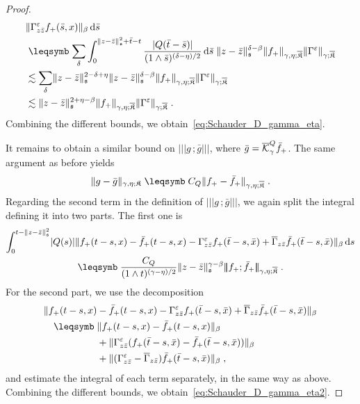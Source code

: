 \documentclass[reqno,11pt]{article}
\def\normDgamma#1{|\!|\!|#1|\!|\!|}
\def\seminormff#1#2{|\!|\!|#1\,\mathord{;}\,#2|\!|\!|}
\def\fraks{\mathfrak{s}}
\def\fraK{\mathfrak{K}}
\def\fraKbar{\overline{\mathfrak{K}}}
\def\Gammabar{\overline\Gamma}
\begin{document}
\begin{proof}
\begin{align*}
&\norm{\Gamma^\eps_{z\bar z} f_+(\bar s,x)}_\beta \6\bar s \\
&\leqs \sum_\delta \int_0^{\norm{z-\bar z}_\fraks^2+\bar t-t}
\frac{\abs{Q(\bar t-\bar s)}}
{(1\wedge\bar s)^{(\delta-\eta)/2}} \6\bar s
\;\norm{z-\bar z}_\fraks^{\delta-\beta}\norm{f_+}_{\gamma,\eta;\fraKbar}
\norm{\Gamma^\eps}_{\gamma;\fraKbar} \\
&\lesssim \sum_\delta \norm{z-\bar z}_\fraks^{2-\delta+\eta}
\norm{z-\bar z}_\fraks^{\delta-\beta}
\norm{f_+}_{\gamma,\eta;\fraKbar}
\norm{\Gamma^\eps}_{\gamma;\fraKbar} \\
&\lesssim \norm{z-\bar z}_\fraks^{2+\eta-\beta}\norm{f_+}_{\gamma,\eta;\fraKbar}
\norm{\Gamma^\eps}_{\gamma;\fraKbar}\;.
\end{align*}
Combining the different bounds, we obtain~\eqref{eq:Schauder_D_gamma_eta}.

It remains to obtain a similar bound on $\seminormff{g}{\bar g}$, where $\bar
g=\overline{{\mathcal K}}^Q_\gamma\bar f_+$. The same argument as before yields 
\[ 
\norm{g-\bar g}_{\gamma,\eta;\fraK} \leqs C_Q
\norm{f_+-\bar f_+}_{\gamma,\eta;\fraKbar}\;. 
\]
Regarding the second term in the definition of $\seminormff{g}{\bar g}$, we
again split the integral defining it into two parts. The first one is  
\begin{align*}
\int_0^{t-\norm{z-\bar z}^2_\fraks} \abs{Q(s)} &\norm{f_+(t-s,x)
-\bar f_+(t-s,x)-\Gamma^\eps_{z\bar z}f_+(\bar t-s,\bar x)
+\Gammabar_{z\bar z}\bar f_+(\bar t-s,\bar x)}_\beta \6s \\
&\leqs \frac{C_Q}{(1\wedge t)^{(\gamma-\eta)/2}} \norm{z-\bar
z}^{\gamma-\beta}_\fraks \normDgamma{f_+;\bar f_+}_{\gamma,\eta;\fraKbar}\;.
\end{align*}
For the second part, we use the decomposition 
\begin{align*}
\norm{f_+(t-s,x)
&-\bar f_+(t-s,x)-\Gamma^\eps_{z\bar z}f_+(\bar t-s,\bar x)
+\Gammabar_{z\bar z}\bar f_+(\bar t-s,\bar x)}_\beta \\
\leqs{}& \norm{f_+(t-s,x)-\bar f_+(t-s,x)}_\beta \\
&{}+\norm{\Gamma^\eps_{z\bar z}(f_+(\bar t-s,\bar x)-\bar f_+(\bar t-s,\bar
x))}_\beta \\
&{}+\norm{(\Gamma^\eps_{z\bar z}-\Gammabar_{z\bar z})\bar f_+(\bar t-s,\bar
x)}_\beta\;,
\end{align*}
and estimate the integral of each term separately, in the same way as above. 
Combining the different bounds, we obtain~\eqref{eq:Schauder_D_gamma_eta2}. 
\end{proof}
\end{document}
